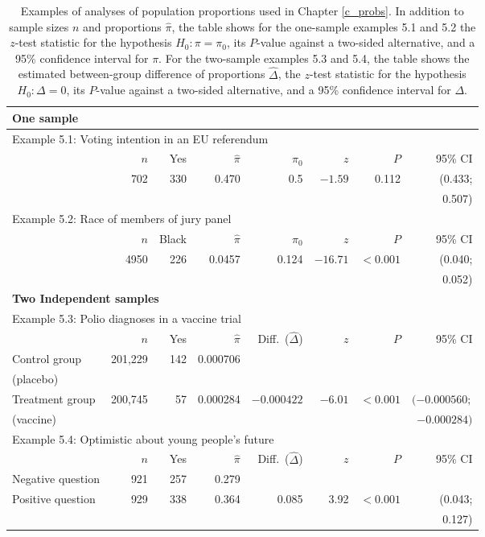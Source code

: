 \begin{table}[t]
\caption{Examples of analyses of population proportions used in Chapter
\ref{c_probs}. In addition to sample sizes $n$ and proportions
$\hat{\pi}$, the table shows for
the one-sample examples 5.1 and 5.2 the
$z$-test statistic for the
hypothesis $H_{0}: \pi=\pi_{0}$, its $P$-value against
a two-sided alternative, and a 95\% confidence interval for $\pi$.
For the two-sample examples 5.3 and 5.4, the table shows
the estimated between-group difference of proportions $\hat{\Delta}$,
the $z$-test statistic for the
hypothesis $H_{0}: \Delta=0$, its $P$-value against
a two-sided alternative, and a 95\% confidence interval for $\Delta$.
}
\label{t_probex}
\begin{center}
\begin{tabular}{|lrrrrrrr|}\hline
\multicolumn{8}{|l|}{\textbf{One sample}} \\ \hline
\multicolumn{8}{|l|}{Example 5.1:
Voting intention in an EU referendum} \\
& $n$ & Yes & $\hat{\pi}$ & $\pi_{0}$ & $z$ & $P$ & 95\% CI \\ \hline
 &
702 & 330 & 0.470 & 0.5 & $-1.59$ & 0.112 & (0.433;\\
& & & & & & & 0.507) \\ \hline
\multicolumn{8}{|l|}{Example 5.2: Race of members of jury panel} \\
& $n$ & Black & $\hat{\pi}$ & $\pi_{0}$ & $z$ & $P$ & 95\% CI \\ \hline
 &
4950 & 226 & 0.0457 & 0.124& $-16.71$ & $<0.001$ & (0.040;\\
& & & & & & & 0.052) \\
\hline \hline
\multicolumn{8}{|l|}{\textbf{Two Independent samples}} \\ \hline
\multicolumn{8}{|l|}{Example 5.3: Polio diagnoses in a vaccine trial}\\
& $n$ & Yes & $\hat{\pi}$ & Diff.\ ($\hat{\Delta}$)& $z$ & $P$ & 95\% CI \\ \hline
Control group
& 201,229 & 142 & 0.000706 & & & &   \\
(placebo) & & & & & & & \\
Treatment group
& 200,745 & 57& 0.000284 & $-0.000422$
& $-6.01$& $<0.001$&  $(-0.000560;$ \\
(vaccine)
& & & & & & & $-0.000284)$ \\ \hline
\multicolumn{8}{|l|}{Example 5.4: Optimistic about young people's future}\\
& $n$ & Yes & $\hat{\pi}$ & Diff.\ ($\hat{\Delta}$)& $z$ & $P$ & 95\% CI \\ \hline
Negative question
& 921 & 257& 0.279 & & & &   \\
Positive question
& 929 & 338& 0.364 & 0.085 & 3.92& $<0.001$& (0.043;\\
& & & & & & & 0.127) \\
\hline
\end{tabular}
\end{center}
\end{table}

